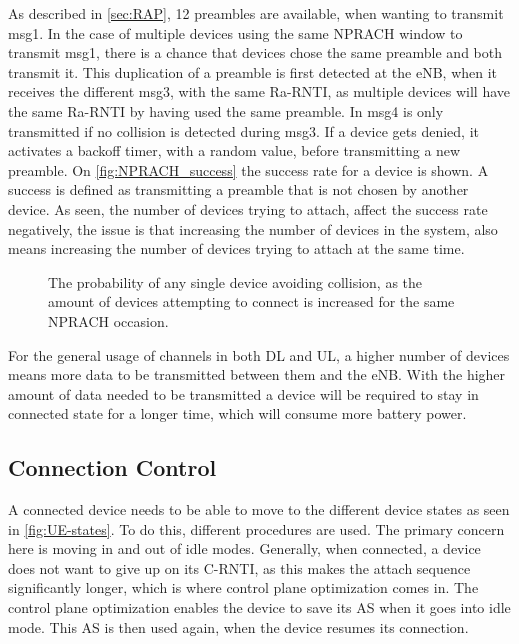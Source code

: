 As described in \autoref{sec:RAP}, 12 preambles are available, when wanting to transmit msg1. In the case of multiple devices using the same NPRACH window to transmit msg1, there is a chance that devices chose the same preamble and both transmit it. This duplication of a preamble is first detected at the eNB, when it receives the different msg3, with the same Ra-RNTI, as multiple devices will have the same Ra-RNTI by having used the same preamble. In msg4 is only transmitted if no collision is detected during msg3. If a device gets denied, it activates a backoff timer, with a random value, before transmitting a new preamble. On \autoref{fig:NPRACH_success} the success rate for a device is shown. A success is defined as transmitting a preamble that is not chosen by another device. As seen, the number of devices trying to attach, affect the success rate negatively, the issue is that increasing the number of devices in the system, also means increasing the number of devices trying to attach at the same time.

\begin{figure}[H]
\centering

\caption{The probability of any single device avoiding collision, as the amount of devices attempting to connect is increased for the same NPRACH occasion.}
\label{fig:NPRACH_success}
\end{figure}

For the general usage of channels in both DL and UL, a higher number of devices means more data to be transmitted between them and the eNB. With the higher amount of data needed to be transmitted a device will be required to stay in connected state for a longer time, which will consume more battery power. 

\subsection{Connection Control}
A connected device needs to be able to move to the different device states as seen in \autoref{fig:UE-states}. To do this, different procedures are used. The primary concern here is moving in and out of idle modes. Generally, when connected, a device does not want to give up on its \gls{C-RNTI}, as this makes the attach sequence significantly longer, which is where control plane optimization comes in. The control plane optimization enables the device to save its \gls{AS} when it goes into idle mode. This \gls{AS} is then used again, when the device resumes its connection. 


